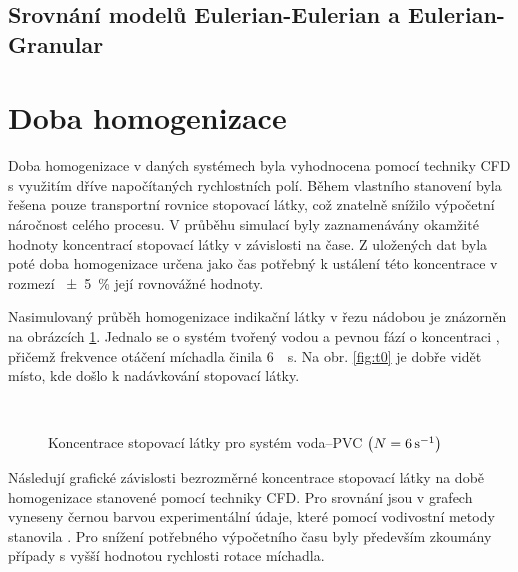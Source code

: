 \subsection{Srovnání modelů Eulerian-Eulerian a Eulerian-Granular}

\section{Doba homogenizace}
Doba homogenizace v daných systémech byla vyhodnocena pomocí techniky CFD s využitím dříve napočítaných rychlostních polí. Během vlastního stanovení byla řešena pouze transportní rovnice stopovací látky, což znatelně snížilo výpočetní náročnost celého procesu. V průběhu simulací byly zaznamenávány okamžité hodnoty koncentrací stopovací látky v závislosti na čase. Z uložených dat byla poté doba homogenizace určena jako čas potřebný k ustálení této koncentrace v rozmezí \SI{\pm 5}{\percent} její rovnovážné hodnoty.

Nasimulovaný průběh homogenizace indikační látky v řezu nádobou je znázorněn na obrázcích \ref{fig:t}. Jednalo se o systém tvořený vodou a pevnou fází o koncentraci , přičemž frekvence otáčení míchadla činila \SI{6}{\per\second}. Na obr. \ref{fig:t0} je dobře vidět místo, kde došlo k nadávkování stopovací látky.

\begin{figure}[h!]
 \centering

  \qquad             
  \\
  \qquad
  \caption{Koncentrace stopovací látky pro systém voda--PVC  $\left( N=\SI{6}{\per\second} \right)$}
  \label{fig:t}
\end{figure}

Následují grafické závislosti bezrozměrné koncentrace stopovací látky na době homogenizace stanovené pomocí techniky CFD. Pro srovnání jsou v grafech vyneseny černou barvou experimentální údaje, které pomocí vodivostní metody stanovila \citet{pav11}. Pro snížení potřebného výpočetního času byly především zkoumány případy s vyšší hodnotou rychlosti rotace míchadla. 

